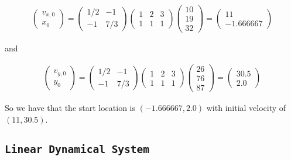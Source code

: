 \[\begin{aligned}
\begin{pmatrix}  v_{x,0} \\ x_0 \end{pmatrix} = \begin{pmatrix} 1/2 & -1 \\ -1 & 7/3 \end{pmatrix}
\begin{pmatrix} 1 & 2 &  3  \\ 1 & 1 & 1\end{pmatrix}  \begin{pmatrix} 10 \\ 19 \\ 32 \end{pmatrix}  = \begin{pmatrix} 11 \\ -1.666667\end{pmatrix}
\end{aligned}\]

and

\[\begin{aligned}
\begin{pmatrix}  v_{y,0} \\ y_0 \end{pmatrix} = \begin{pmatrix} 1/2 & -1 \\ -1 & 7/3 \end{pmatrix}
\begin{pmatrix} 1 & 2 &  3  \\ 1 & 1 & 1\end{pmatrix} \begin{pmatrix} 26 \\ 76 \\ 87\end{pmatrix} = \begin{pmatrix} 30.5 \\ 2.0\end{pmatrix}
\end{aligned}\]

So we have that the start location is \((-1.666667, 2.0)\) with initial
velocity of \((11 , 30.5)\).

\hypertarget{linear-dynamical-system}{%
\subsection{\texorpdfstring{\texttt{Linear\ Dynamical\ System}}{Linear Dynamical System}}\label{linear-dynamical-system}}

